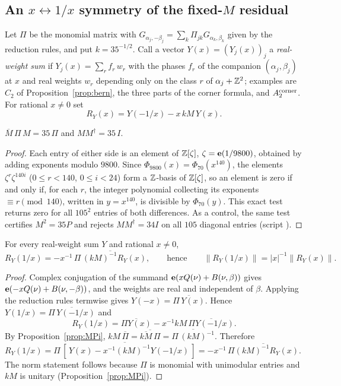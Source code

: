 \subsection{An $x\leftrightarrow1/x$ symmetry of the fixed-$M$ residual}\label{sec:xinv}
Let $\Pi$ be the monomial matrix with $G_{\alpha_j,-\beta_j}=\sum_k\Pi_{jk}G_{\alpha_k,\beta_k}$ given by the reduction rules, and put $k=35^{-1/2}$. Call a vector $Y(x)=(Y_j(x))_j$ a
\emph{real-weight sum} if $Y_j(x)=\sum_r f_r\,w_r$ with the phases $f_r$ of the companion $(\alpha_j,\beta_j)$ at $x$ and real weights $w_r$ depending only on the class
$r$ of $\alpha_j+\mathbb{Z}^2$; examples are $C_2$ of Proposition~\ref{prop:bern}, the three parts of the corner formula, and $A_2^{\rm corner}$. For rational $x\neq0$ set
\[ R_Y(x)=Y(-1/x)-x\,kM\,Y(x). \]
\begin{proposition}\label{prop:MPi}
$\overline{M}\,\Pi\,M=35\,\Pi$ and $MM^{\dagger}=35\,I$.
\end{proposition}
\begin{proof}
Each entry of either side is an element of $\mathbb{Z}[\zeta]$, $\zeta=\mathbf{e}(1/9800)$, obtained by adding exponents modulo $9800$. Since $\Phi_{9800}(x)=\Phi_{70}(x^{140})$, the elements
$\zeta^r\zeta^{140i}$ ($0\le r<140$, $0\le i<24$) form a $\mathbb{Z}$-basis of $\mathbb{Z}[\zeta]$, so an element is zero if and only if, for each $r$, the integer polynomial collecting its
exponents $\equiv r\pmod{140}$, written in $y=x^{140}$, is divisible by $\Phi_{70}(y)$. This exact test returns zero for all $105^2$ entries of both differences. As a control,
the same test certifies $M^2=35P$ and rejects $MM^\dagger=34I$ on all $105$ diagonal entries (script ).
\end{proof}
\begin{theorem}\label{thm:xinv}
For every real-weight sum $Y$ and rational $x\neq0$,
\[ R_Y(1/x)=-x^{-1}\,\overline{\Pi\,(kM)^{-1}R_Y(x)},\qquad\text{hence}\qquad \|R_Y(1/x)\|=|x|^{-1}\|R_Y(x)\|. \]
\end{theorem}
\begin{proof}
Complex conjugation of the summand $\mathbf{e}(xQ(\nu)+B(\nu,\beta))$ gives $\mathbf{e}(-xQ(\nu)+B(\nu,-\beta))$, and the weights are real and independent of $\beta$. Applying the reduction rules
termwise gives $Y(-x)=\overline{\Pi\,Y(x)}$. Hence $Y(1/x)=\overline{\Pi\,Y(-1/x)}$ and
\[ R_Y(1/x)=\overline{\Pi Y(x)}-x^{-1}kM\,\overline{\Pi Y(-1/x)}. \]
By Proposition~\ref{prop:MPi}, $kM\,\overline{\Pi}=\overline{\overline{kM}\,\Pi}=\overline{\Pi\,(kM)^{-1}}$. Therefore
$R_Y(1/x)=\overline{\Pi\,[\,Y(x)-x^{-1}(kM)^{-1}Y(-1/x)\,]}=-x^{-1}\,\overline{\Pi(kM)^{-1}R_Y(x)}$. The norm statement follows because $\Pi$ is monomial with unimodular
entries and $kM$ is unitary (Proposition~\ref{prop:MPi}).
\end{proof}
